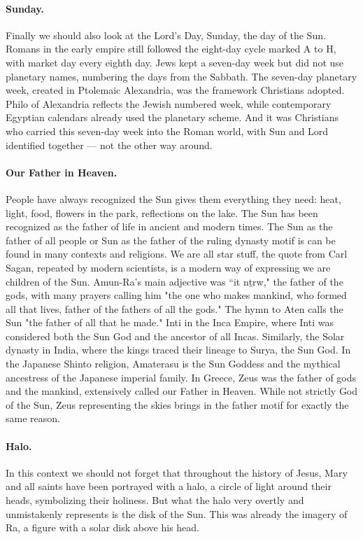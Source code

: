 \paragraph{Sunday.} Finally we should also look at the Lord’s Day, Sunday, the day of the Sun.
Romans in the early empire still followed the eight-day cycle marked A to H, with market day every eighth day.
Jews kept a seven-day week but did not use planetary names, numbering the days from the Sabbath.
The seven-day planetary week, created in Ptolemaic Alexandria, was the framework Christians adopted.
Philo of Alexandria reflects the Jewish numbered week, while contemporary Egyptian calendars already used the planetary scheme.
And it was Christians who carried this seven-day week into the Roman world, with Sun and Lord identified together — not the other way around.

\paragraph{Our Father in Heaven.}
People have always recognized the Sun gives them everything they need: heat, light, food, flowers in the park, reflections on the lake.
The Sun has been recognized as the father of life in ancient and modern times.
The Sun as the father of all people or Sun as the father of the ruling dynasty motif is can be found in many contexts and religions.
We are all star stuff, the quote from Carl Sagan, repeated by modern scientists, is a modern way of expressing we are children of the Sun.
Amun-Ra's main adjective was “it nṯrw," the father of the gods, with many prayers calling him "the one who makes mankind, who formed all that lives, father of the fathers of all the gods."
The hymn to Aten calls the Sun "the father of all that he made."
Inti in the Inca Empire, where Inti was considered both the Sun God and the ancestor of all Incas.
Similarly, the Solar dynasty in India, where the kings traced their lineage to Surya, the Sun God.
In the Japanese Shinto religion, Amaterasu is the Sun Goddess and the mythical ancestress of the Japanese imperial family.
In Greece, Zeus was the father of gods and the mankind, extensively called our Father in Heaven.
While not strictly God of the Sun, Zeus representing the skies brings in the father motif for exactly the same reason.

\paragraph{Halo.}
In this context we should not forget that throughout the history of Jesus, Mary and all saints have been portrayed with a halo, a circle of light around their heads, symbolizing their holiness.
But what the halo very overtly and unmistakenly represents is the disk of the Sun.
This was already the imagery of Ra, a figure with a solar disk above his head.

